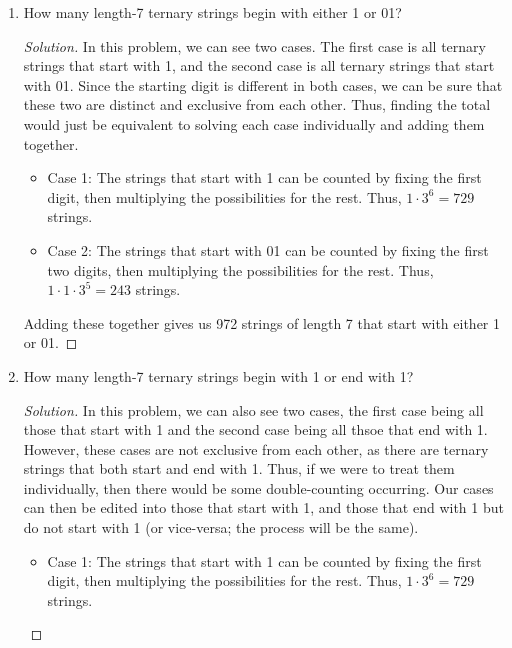 \documentclass{article}
\newenvironment{solution}
  {\renewcommand\qedsymbol{$\blacksquare$}\begin{proof}[Solution]}
  {\end{proof}}
\begin{document}
\begin{enumerate}
\begin{solution}
        which would be the ones with $\neq$ four 1's. To get this number, we add $\binom{9}{0} + \binom{9}{1} + \hdots + \binom{9}{3} + \binom{9}{5} + \hdots + \binom{9}{9}$, giving us $512 - 386 = 126$. However, this solution 
        is much longer and I don't like it. 
    \end{solution} 
    \item  How many length-7 ternary strings begin with either 1 or 01? \begin{solution} 
        In this problem, we can see two cases. The first case is all ternary strings that start with 1, and the second case is all ternary strings that start with 01. Since the starting digit 
        is different in both cases, we can be sure that these two are distinct and exclusive from each other. Thus, finding the total would just be equivalent to solving each case individually 
        and adding them together. 
        \begin{itemize}
            \item Case 1: The strings that start with 1 can be counted by fixing the first digit, then multiplying the possibilities for the rest. Thus, $1 \cdot 3^6 = 729$ strings. 
            \item Case 2: The strings that start with 01 can be counted by fixing the first two digits, then multiplying the possibilities for the rest. Thus, $1 \cdot 1 \cdot 3^5 = 243$ strings. 
        \end{itemize} Adding these together gives us 972 strings of length 7 that start with either 1 or 01. 
    \end{solution} 
    \item How many length-7 ternary strings begin with 1 or end with 1?\begin{solution} 
        In this problem, we can also see two cases, the first case being all those that start with 1 and the second case being all thsoe that end with 1. However, these cases are not exclusive 
        from each other, as there are ternary strings that both start and end with 1. Thus, if we were to treat them individually, then there would be some double-counting occurring. Our cases can 
        then be edited into those that start with 1, and those that end with 1 but do not start with 1 (or vice-versa; the process will be the same). 
        \begin{itemize} 
            \item Case 1: The strings that start with 1 can be counted by fixing the first digit, then multiplying the possibilities for the rest. Thus, $1 \cdot 3^6 = 729$ strings.

\end{itemize}
\end{solution}
\end{enumerate}
\end{document}
